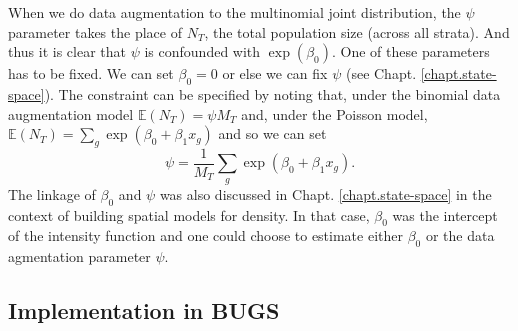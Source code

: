 When we do data augmentation to the multinomial joint distribution,
the $\psi$ parameter takes the place of $N_{T}$, the total population
size (across all strata). And thus it is clear that $\psi$ is
confounded with $\exp(\beta_{0})$. 
One of these parameters has to be fixed. We can set $\beta_0 = 0$ or
else we can fix $\psi$ (see Chapt. \ref{chapt.state-space}).  The
constraint can be specified by noting that, under the binomial data
augmentation model $\mathbb{E}(N_{T}) = \psi M_{T}$ and, under the
Poisson model, $\mathbb{E}(N_{T}) = \sum_{g} \exp(\beta_{0} +
\beta_{1} x_{g})$ and so we can set
\[
 \psi = \frac{1}{M_{T}} \sum_{g} \exp(\beta_{0} + \beta_{1} x_{g}).
\]
The linkage of $\beta_{0}$ and $\psi$ was also discussed in
Chapt. \ref{chapt.state-space} in the context of building spatial
models for density. In that case, $\beta_0$ was the intercept of the
intensity function and one could choose to estimate either $\beta_0$
or the data agmentation parameter $\psi$.

\subsection{Implementation in BUGS}

